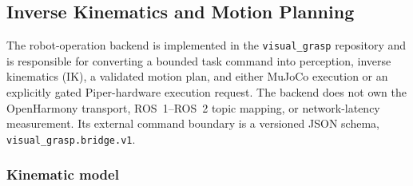%
%
%

\subsection{Inverse Kinematics and Motion Planning}
\label{sec:visual-grasp-ik-motion}

The robot-operation backend is implemented in the \texttt{visual\_grasp}
repository and is responsible for converting a bounded task command into
perception, inverse kinematics (IK), a validated motion plan, and either
MuJoCo execution or an explicitly gated Piper-hardware execution request.
The backend does not own the OpenHarmony transport, ROS~1--ROS~2 topic
mapping, or network-latency measurement. Its external command boundary is a
versioned JSON schema, \texttt{visual\_grasp.bridge.v1}.

\subsubsection{Kinematic model}

